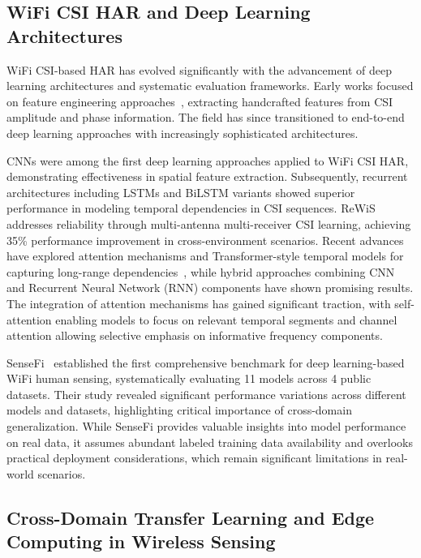 \documentclass[journal]{IEEEtran}
\begin{document}
\subsection{WiFi CSI HAR and Deep Learning Architectures}

WiFi CSI-based HAR has evolved significantly with the advancement of deep learning architectures and systematic evaluation frameworks. Early works focused on feature engineering approaches~\cite{csi_basics2016}, extracting handcrafted features from CSI amplitude and phase information. The field has since transitioned to end-to-end deep learning approaches with increasingly sophisticated architectures.

CNNs were among the first deep learning approaches applied to WiFi CSI HAR, demonstrating effectiveness in spatial feature extraction. Subsequently, recurrent architectures including LSTMs and BiLSTM variants showed superior performance in modeling temporal dependencies in CSI sequences. ReWiS~\cite{bahadori2022rewis} addresses reliability through multi-antenna multi-receiver CSI learning, achieving 35\% performance improvement in cross-environment scenarios. Recent advances have explored attention mechanisms and Transformer-style temporal models for capturing long-range dependencies~\cite{gulati2020conformer,li2020tea,bertasius2021timesformer,lim2021tft,zhou2021informer}, while hybrid approaches combining CNN and Recurrent Neural Network (RNN) components have shown promising results. The integration of attention mechanisms has gained significant traction, with self-attention enabling models to focus on relevant temporal segments and channel attention allowing selective emphasis on informative frequency components.

SenseFi~\cite{yang2023sensefi} established the first comprehensive benchmark for deep learning-based WiFi human sensing, systematically evaluating 11 models across 4 public datasets. Their study revealed significant performance variations across different models and datasets, highlighting critical importance of cross-domain generalization. While SenseFi provides valuable insights into model performance on real data, it assumes abundant labeled training data availability and overlooks practical deployment considerations, which remain significant limitations in real-world scenarios.

\subsection{Cross-Domain Transfer Learning and Edge Computing in Wireless Sensing}
\end{document}
